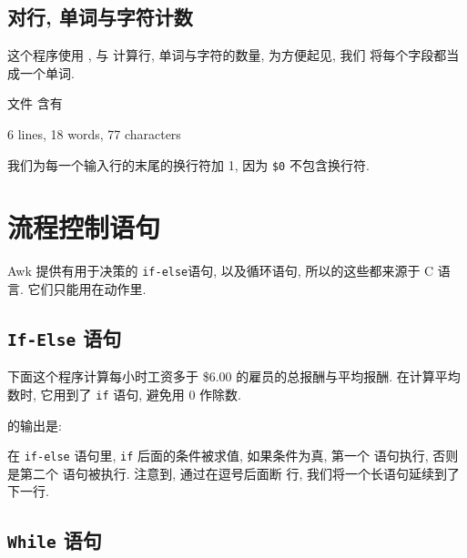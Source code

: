 \subsection{对行, 单词与字符计数}
\label{subsec:counting_lines_words_and_characters}

这个程序使用 \length, \nf 与 \nr 计算行, 单词与字符的数量, 为方便起见, 我们
将每个字段都当成一个单词.
文件  含有
\begin{file}
    6 lines, 18 words, 77 characters
\end{file}
我们为每一个输入行的末尾的换行符加 1, 因为 \verb'$0' 不包含换行符.

\section{流程控制语句}
\label{sec:control_flow_statements}

Awk 提供有用于决策的 \verb'if-else'语句, 以及循环语句, 所以的这些都来源于
C 语言. 它们只能用在动作里.

\subsection{\texttt{If-Else} 语句}
\label{subsec:if_else_statement}

下面这个程序计算每小时工资多于 \$6.00 的雇员的总报酬与平均报酬. 在计算平均
数时, 它用到了 \texttt{if} 语句, 避免用 0 作除数.
 的输出是:
在 \verb'if-else' 语句里, \verb'if' 后面的条件被求值, 如果条件为真, 第一个
\print 语句执行, 否则是第二个 \print 语句被执行. 注意到, 通过在逗号后面断
行, 我们将一个长语句延续到了下一行.

\subsection{\texttt{While} 语句}
\label{subsec:while_statement}

